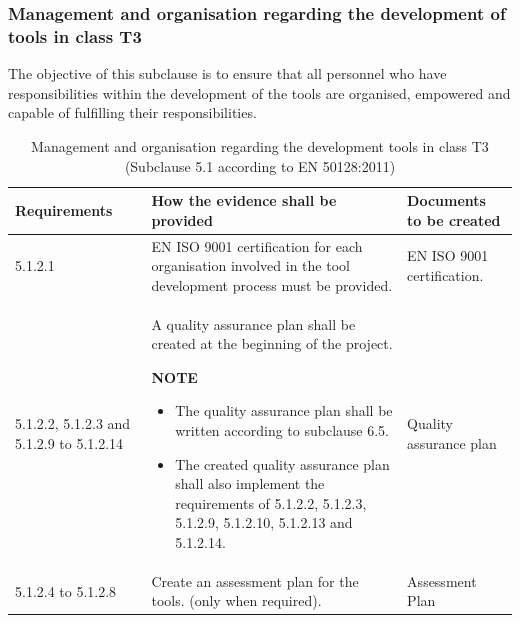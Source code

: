 \documentclass{template/openetcs_report}
\begin{document}
\subsubsection{Management and organisation regarding the development of tools in class T3}
The objective of this subclause is to ensure that all personnel who have responsibilities within the development of the tools are organised, empowered and capable of fulfilling their responsibilities.
{\footnotesize\sffamily\centering
\begin{longtable}{|p{2cm}|p{9cm}|p{3cm}|}
\caption{Management and organisation regarding the development tools in class T3 (Subclause 5.1 according to EN 50128:2011)}\\
\hline
\bfseries Requirements & \bfseries How the evidence shall be provided & \bfseries Documents to be created\\
\hline
\hline
\endhead
\hline
\endfoot

5.1.2.1 & EN ISO 9001 certification for each organisation involved in the tool development process must be provided. & EN ISO 9001 certification.\\ 
\hline
5.1.2.2, 5.1.2.3 and 5.1.2.9 to 5.1.2.14 & A quality assurance plan shall be created at the beginning of the project. 

\textbf{NOTE }
\begin{itemize}\itemsep=0pt
  \item The quality assurance plan shall be written according to subclause 6.5.
  \item The created quality assurance plan shall also implement the requirements of 5.1.2.2, 5.1.2.3, 5.1.2.9, 5.1.2.10, 5.1.2.13 and 5.1.2.14.
\end{itemize}
& Quality assurance plan\\ 
\hline
5.1.2.4 to 5.1.2.8 & Create an assessment plan for the tools. (only when required).
& Assessment Plan\\ 
\hline
\end{longtable}}
\end{document}

